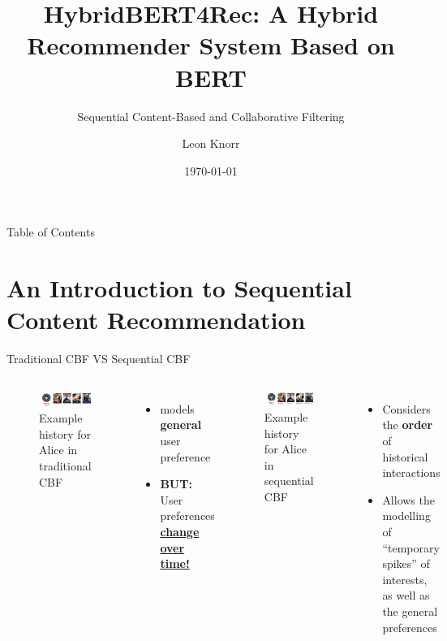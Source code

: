 \documentclass[en]{sdqbeamer}
\title[HybridBERT4Rec]{HybridBERT4Rec: A Hybrid Recommender System Based on BERT}
\subtitle{Sequential Content-Based and Collaborative Filtering}
\author[Leon Knorr]{Leon Knorr}
\date[\today]{\today}
\begin{document}
 
\KITtitleframe

\begin{frame}{Table of Contents}
\tableofcontents
\end{frame}

\section{An Introduction to Sequential Content Recommendation}

\begin{frame}{Traditional CBF VS Sequential CBF}
	\begin{columns}
		\begin{figure}
			\includegraphics[width=\textwidth]{images/Alice_history.pdf}
			\caption{Example history for Alice in traditional CBF \cite{channarongHybridBERT4RecHybridContentBased2022}}
		\end{figure}
		\begin{itemize}
			\item models \textbf{general} user preference \pause
			\item \textbf{BUT:} User preferences \underline{\textbf{change over time!}} \cite{wangSequentialRecommenderSystems2019}
		\end{itemize}

		\begin{figure}\pause
			\includegraphics[width=\textwidth]{images/Alice_seq.pdf}
			\caption{Example history for Alice in sequential CBF \cite{channarongHybridBERT4RecHybridContentBased2022}}
		\end{figure}
		\begin{itemize}
			\item Considers the \textbf{order} of historical interactions
			\item Allows the modelling of \enquote{temporary spikes} of interests, as well as the general preferences \cite{wangSequentialRecommenderSystems2019}
		\end{itemize}
	\end{columns}
\end{frame}
\end{document}
